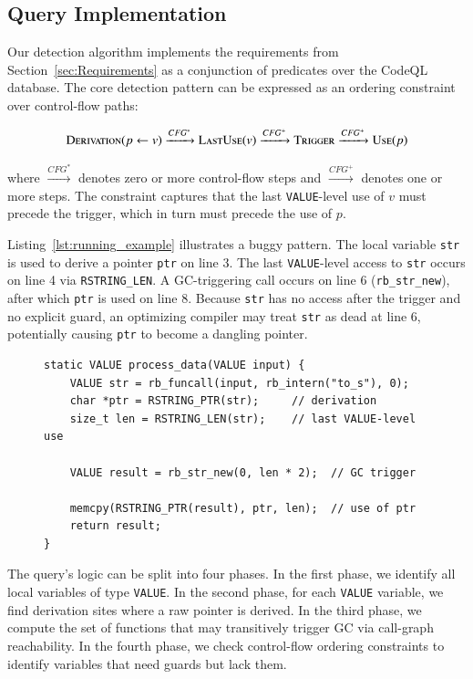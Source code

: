 \subsection{Query Implementation}\label{sec:detection_algorithm}

Our detection algorithm implements the requirements from Section~\ref{sec:Requirements} as a conjunction of predicates over the CodeQL database. The core detection pattern can be expressed as an ordering constraint over control-flow paths:

\[
\textsc{Derivation}(p \leftarrow v) \xrightarrow{CFG^*} \textsc{LastUse}(v) \xrightarrow{CFG^+} \textsc{Trigger} \xrightarrow{CFG^+} \textsc{Use}(p)
\]

where $\xrightarrow{CFG^*}$ denotes zero or more control-flow steps and $\xrightarrow{CFG^+}$ denotes one or more steps. The constraint captures that the last \texttt{VALUE}-level use of $v$ must precede the trigger, which in turn must precede the use of $p$.

Listing~\ref{lst:running_example} illustrates a buggy pattern. The local variable \texttt{str} is used to derive a pointer \texttt{ptr} on line 3. The last \texttt{VALUE}-level access to \texttt{str} occurs on line 4 via \texttt{RSTRING\_LEN}. A GC-triggering call occurs on line 6 (\texttt{rb\_str\_new}), after which \texttt{ptr} is used on line 8. Because \texttt{str} has no access after the trigger and no explicit guard, an optimizing compiler may treat \texttt{str} as dead at line 6, potentially causing \texttt{ptr} to become a dangling pointer.

\begin{figure}[tb]
\begin{lstlisting}[caption={A buggy example.},label={lst:running_example}]
static VALUE process_data(VALUE input) {
    VALUE str = rb_funcall(input, rb_intern("to_s"), 0);
    char *ptr = RSTRING_PTR(str);     // derivation
    size_t len = RSTRING_LEN(str);    // last VALUE-level use

    VALUE result = rb_str_new(0, len * 2);  // GC trigger

    memcpy(RSTRING_PTR(result), ptr, len);  // use of ptr
    return result;
}
\end{lstlisting}
\end{figure}

The query's logic can be split into four phases. In the first phase, we identify all local variables of type \texttt{VALUE}. In the second phase, for each \texttt{VALUE} variable, we find derivation sites where a raw pointer is derived. In the third phase, we compute the set of functions that may transitively trigger GC via call-graph reachability. In the fourth phase, we check control-flow ordering constraints to identify variables that need guards but lack them.

